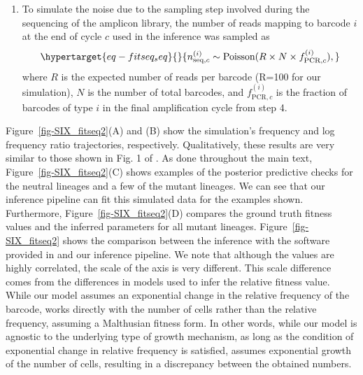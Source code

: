 \documentclass[
]{scrartcl}
\providecommand{\tightlist}{%
  \setlength{\itemsep}{0pt}\setlength{\parskip}{0pt}}\usepackage{longtable,booktabs,array}
\begin{document}
\begin{refsegment}
\begin{enumerate}
\def\labelenumi{\arabic{enumi}.}
\setcounter{enumi}{6}
\tightlist
\item
  To simulate the noise due to the sampling step involved during the
  sequencing of the amplicon library, the number of reads mapping to
  barcode \(i\) at the end of cycle \(c\) used in the inference was
  sampled as \begin{equation}\protect\hypertarget{eq-fitseq_seq}{}{
  n_{\text{seq},c}^{(i)} \sim 
  \text{Poisson}(R \times N \times f_{\text{PCR},c}^{(i)}),
  }\label{eq-fitseq_seq}\end{equation} where \(R\) is the expected
  number of reads per barcode (R=100 for our simulation), \(N\) is the
  number of total barcodes, and \(f_{\text{PCR},c}^{(i)}\) is the
  fraction of barcodes of type \(i\) in the final amplification cycle
  from step 4.
\end{enumerate}

Figure~\ref{fig-SIX_fitseq2}(A) and (B) show the simulation's frequency
and log frequency ratio trajectories, respectively. Qualitatively, these
results are very similar to those shown in Fig. 1 of \textcite{li2023}.
As done throughout the main text, Figure~\ref{fig-SIX_fitseq2}(C) shows
examples of the posterior predictive checks for the neutral lineages and
a few of the mutant lineages. We can see that our inference pipeline can
fit this simulated data for the examples shown. Furthermore,
Figure~\ref{fig-SIX_fitseq2}(D) compares the ground truth fitness values
and the inferred parameters for all mutant lineages.
Figure~\ref{fig-SIX_fitseq2} shows the comparison between the inference
with the software provided in \autocite{li2023} and our inference
pipeline. We note that although the values are highly correlated, the
scale of the axis is very different. This scale difference comes from
the differences in models used to infer the relative fitness value.
While our model assumes an exponential change in the relative frequency
of the barcode, \textcite{li2023} works directly with the number of
cells rather than the relative frequency, assuming a Malthusian fitness
form. In other words, while our model is agnostic to the underlying type
of growth mechanism, as long as the condition of exponential change in
relative frequency is satisfied, \textcite{li2023} assumes exponential
growth of the number of cells, resulting in a discrepancy between the
obtained numbers.

\begin{figure}


\end{figure}
\end{refsegment}
\end{document}
